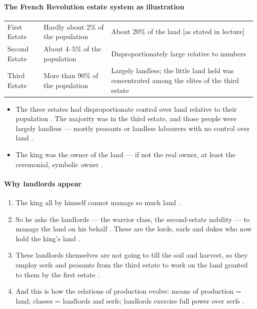 \paragraph{The French Revolution estate system as illustration}
\begin{table}[h!]
\centering
\begin{tabularx}{\textwidth}{lYY}
\toprule
{}
 &  &  \\
\midrule
First Estate & Hardly about 2\% of the population & About 20\% of the land [as stated in lecture] \\
Second Estate & About 4--5\% of the population & Disproportionately large relative to numbers \\
Third Estate & More than 90\% of the population & Largely landless; the little land held was concentrated among the elites of the third estate \\
\bottomrule
\end{tabularx}
\end{table}

\begin{itemize}
    \item The three estates had disproportionate control over land relative to their population . The majority was in the third estate, and those people were largely landless --- mostly peasants or landless labourers with no control over land .
    \item The king was the owner of the land --- if not the real owner, at least the ceremonial, symbolic owner .
\end{itemize}

\paragraph{Why landlords appear}
\begin{enumerate}
    \item The king all by himself cannot manage so much land .
    \item So he asks the landlords --- the warrior class, the second-estate nobility --- to manage the land on his behalf . These are the lords, earls and dukes who now hold the king's land .
    \item These landlords themselves are not going to till the soil and harvest, so they employ serfs and peasants from the third estate to work on the land granted to them by the first estate .
    \item And this is how the relations of production evolve: means of production = land; classes = landlords and serfs; landlords exercise full power over serfs .
\end{enumerate}


